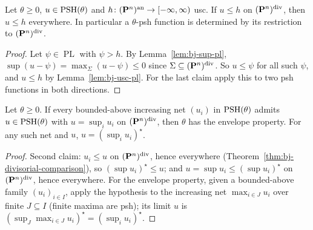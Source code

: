 \begin{theorem}\label{thm:bj-divisorial-comparison}
\leanok
{}
Let $\theta\ge0$, $u\in\operatorname{PSH}(\theta)$ and $h\colon(\mathbf{P}^n)^{\mathrm{an}}\to[-\infty,\infty)$ usc. If $u\le h$ on
$(\mathbf{P}^n)^{\mathrm{div}}$, then $u\le h$ everywhere. In particular a $\theta$-psh function is determined by its
restriction to $(\mathbf{P}^n)^{\mathrm{div}}$.
\end{theorem}

\begin{proof}
Let $\psi\in\operatorname{PL}$ with $\psi>h$. By Lemma~\ref{lem:bj-sup-pl}, $\sup(u-\psi)=\max_\Sigma(u-\psi)\le0$
since $\Sigma\subseteq(\mathbf{P}^n)^{\mathrm{div}}$. So $u\le\psi$ for all such $\psi$, and $u\le h$ by
Lemma~\ref{lem:bj-usc-pl}. For the last claim apply this to two psh functions in both directions.
\end{proof}

\begin{proposition}\label{prop:bj-ep-criterion}
\leanok
{}
Let $\theta\ge0$. If every bounded-above increasing net $(u_i)$ in $\operatorname{PSH}(\theta)$ admits $u\in\operatorname{PSH}(\theta)$ with
$u=\sup_iu_i$ on $(\mathbf{P}^n)^{\mathrm{div}}$, then $\theta$ has the envelope property. For any such net and $u$,
$u=(\sup_iu_i)^\star$.
\end{proposition}

\begin{proof}
Second claim: $u_i\le u$ on $(\mathbf{P}^n)^{\mathrm{div}}$, hence everywhere (Theorem~\ref{thm:bj-divisorial-comparison}),
so $(\sup u_i)^\star\le u$; and $u=\sup u_i\le(\sup u_i)^\star$ on $(\mathbf{P}^n)^{\mathrm{div}}$, hence everywhere. For the
envelope property, given a bounded-above family $(u_i)_{i\in I}$, apply the hypothesis to the increasing net
$\max_{i\in J}u_i$ over finite $J\subseteq I$ (finite maxima are psh); its limit $u$ is
$(\sup_J\max_{i\in J}u_i)^\star=(\sup_iu_i)^\star$.
\end{proof}

